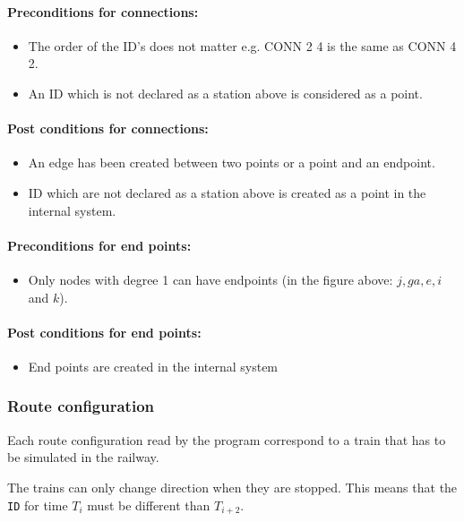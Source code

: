 \documentclass[10pt,a4paper]{article}
\def\Code#1{\texttt{#1}}
\begin{document}
\paragraph{Preconditions for connections:}
\begin{itemize}
  \item The order of the ID’s does not matter e.g. CONN 2 4 is the same as CONN 4 2.
  \item An ID which is not declared as a station above is considered as a point.
\end{itemize}

\paragraph{Post conditions for connections:}
\begin{itemize}
  \item An edge has been created between two points or a point and an endpoint.
  \item ID which are not declared as a station above is created as a point in the internal system.
\end{itemize} 

\paragraph{Preconditions for end points:}
\begin{itemize}
  \item Only nodes with degree 1 can have endpoints (in the figure above: $j, g a, e, i$ and $k$).
\end{itemize}
 
\paragraph{Post conditions for end points:}
\begin{itemize}
  \item End points are created in the internal system
\end{itemize}

\subsubsection{Route configuration}
 
Each route configuration read by the program correspond to a train that has to be simulated in the railway.
 
The trains can only change direction when they are stopped. This means that the \Code{ID} for time $T_i$ must be different than $T_{i+2}$.
 
\end{document}
